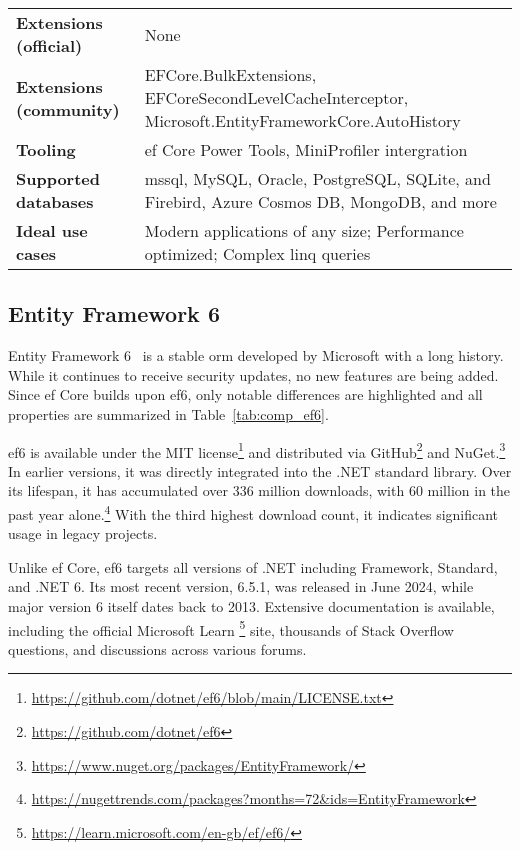 {\begin{landscape}
\begin{table}[p]
\begin{tabular}{
>{\raggedright\arraybackslash}p{40.00mm}
>{\arraybackslash}p{150.00mm}
}
\textbf{Extensions (official)} & None \\
\textbf{Extensions (community)} & EFCore.BulkExtensions, EFCoreSecondLevelCacheInterceptor, Microsoft.EntityFrameworkCore.AutoHistory \\
\textbf{Tooling} & \acrshort{ef} Core Power Tools, MiniProfiler intergration \\
\textbf{Supported databases} & \acrshort{mssql}, MySQL, Oracle, PostgreSQL, SQLite, and Firebird, Azure Cosmos DB, MongoDB, and more  \\
\textbf{Ideal use cases} & Modern applications of any size; Performance optimized; Complex \acrshort{linq} queries \\
\bottomrule
\end{tabular}
\end{table}
\end{landscape}
}

\subsection{Entity Framework 6}
Entity Framework 6~\cite{ef6,ef6Repo} is a stable \acrshort{orm} developed by Microsoft with a long history. While it continues to receive security updates, no new features are being added. Since \acrshort{ef} Core builds upon \acrshort{ef}6, only notable differences are highlighted and all properties are summarized in Table~\ref{tab:comp_ef6}.

\acrshort{ef}6 is available under the MIT license\footnote{\url{https://github.com/dotnet/ef6/blob/main/LICENSE.txt}} and distributed via GitHub\footnote{\url{https://github.com/dotnet/ef6}} and NuGet.\footnote{\url{https://www.nuget.org/packages/EntityFramework/}} In earlier versions, it was directly integrated into the .NET standard library. Over its lifespan, it has accumulated over 336 million downloads, with 60 million in the past year alone.\footnote{\url{https://nugettrends.com/packages?months=72&ids=EntityFramework}} With the third highest download count, it indicates significant usage in legacy projects.

Unlike \acrshort{ef} Core, \acrshort{ef}6 targets all versions of .NET including Framework, Standard, and .NET 6. Its most recent version, 6.5.1, was released in June 2024, while major version 6 itself dates back to 2013. Extensive documentation is available, including the official Microsoft Learn \footnote{\url{https://learn.microsoft.com/en-gb/ef/ef6/}} site, thousands of Stack Overflow questions, and discussions across various forums.


